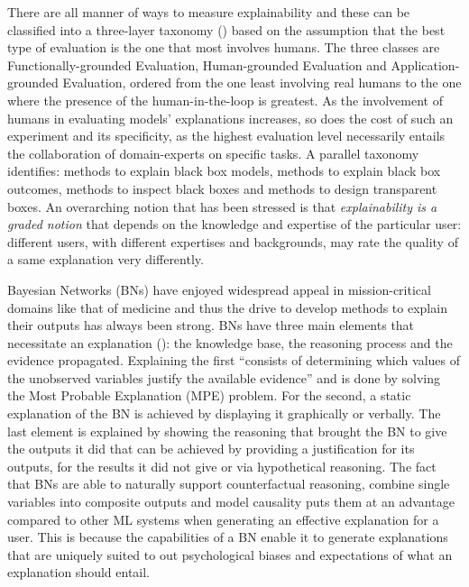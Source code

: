 \documentclass[mscthesis]{usiinfthesis}
\begin{document}
There are all manner of ways to measure explainability and these can be classified into a three-layer taxonomy (\cite{doshi2017towards}) based on the assumption that the best type of evaluation is the one that most involves humans.
The three classes are Functionally-grounded Evaluation, Human-grounded Evaluation and Application-grounded Evaluation, ordered from the one least involving real humans to the one where the presence of the human-in-the-loop is greatest.
As the involvement of humans in evaluating models' explanations increases, so does the cost of such an experiment and its specificity, as the highest evaluation level necessarily entails the collaboration of domain-experts on specific tasks.
A parallel taxonomy identifies: methods to explain black box models, methods to explain black box outcomes, methods to inspect black boxes and methods to design transparent boxes.
An overarching notion that has been stressed is that \textit{explainability is a graded notion} that depends on the knowledge and expertise of the particular user: different users, with different expertises and backgrounds, may rate the quality of a same explanation very differently.

Bayesian Networks (BNs) have enjoyed widespread appeal in mission-critical domains like that of medicine and thus the drive to develop methods to explain their outputs has always been strong.
BNs have three main elements that necessitate an explanation (\cite{lacave2002review}): the knowledge base, the reasoning process and the evidence propagated.
Explaining the first \enquote{consists of determining which values of the unobserved variables justify the available evidence} and is done by solving the Most Probable Explanation (MPE) problem.
For the second, a static explanation of the BN is achieved by displaying it graphically or verbally.
The last element is explained by showing the reasoning that brought the BN to give the outputs it did that can be achieved by providing a justification for its outputs, for the results it did not give or via hypothetical reasoning.
The fact that BNs are able to naturally support counterfactual reasoning, combine single variables into composite outputs and model causality puts them at an advantage compared to other ML systems when generating an effective explanation for a user.
This is because the capabilities of a BN enable it to generate explanations that are uniquely suited to out psychological biases and expectations of what an explanation should entail.
\end{document}
